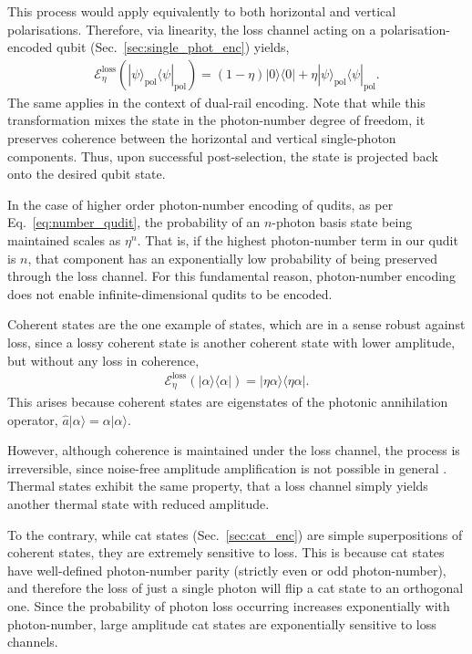 \documentclass[aps,rmp,twocolumn,amsmath,amssymb,nofootinbib,superscriptaddress,longbibliography,floatfix]{revtex4-1}
\newcommand{\bra}[1]{\langle#1|}
\newcommand{\ket}[1]{|#1\rangle}
\begin{document}
This process would apply equivalently to both horizontal and vertical polarisations. Therefore, via linearity, the loss channel acting on a polarisation-encoded qubit (Sec.~\ref{sec:single_phot_enc}) yields,
\begin{align}
\mathcal{E}^\mathrm{loss}_\eta(\ket\psi_\mathrm{pol}\bra\psi_\mathrm{pol}) = (1-\eta) \ket{0}\bra{0} + \eta\ket\psi_\mathrm{pol}\bra\psi_\mathrm{pol}.
\end{align}
The same applies in the context of dual-rail encoding. Note that while this transformation mixes the state in the photon-number degree of freedom, it preserves coherence between the horizontal and vertical single-photon components. Thus, upon successful post-selection, the state is projected back onto the desired qubit state.

In the case of higher order photon-number encoding of qudits, as per Eq.~\ref{eq:number_qudit}, the probability of an $n$-photon basis state being maintained scales as $\eta^n$. That is, if the highest photon-number term in our qudit is $n$, that component has an exponentially low probability of being preserved through the loss channel. For this fundamental reason, photon-number encoding does not enable infinite-dimensional qudits to be encoded.

Coherent states are the one example of states, which are in a sense robust against loss, since a lossy coherent state is another coherent state with lower amplitude, but without any loss in coherence,
\begin{align}
\mathcal{E}^\mathrm{loss}_\eta(\ket\alpha\bra\alpha) = \ket{\eta\alpha}\bra{\eta\alpha}.
\end{align}
This arises because coherent states are eigenstates of the photonic annihilation operator, \mbox{$\hat{a}\ket{\alpha}=\alpha\ket{\alpha}$}.

However, although coherence is maintained under the loss channel, the process is irreversible, since noise-free amplitude amplification is not possible in general \cite{???}. Thermal states exhibit the same property, that a loss channel simply yields another thermal state with reduced amplitude.

To the contrary, while cat states (Sec.~\ref{sec:cat_enc}) are simple superpositions of coherent states, they are extremely sensitive to loss. This is because cat states have well-defined photon-number parity (strictly even or odd photon-number), and therefore the loss of just a single photon will flip a cat state to an orthogonal one. Since the probability of photon loss occurring increases exponentially with photon-number, large amplitude cat states are exponentially sensitive to loss channels.
\end{document}
